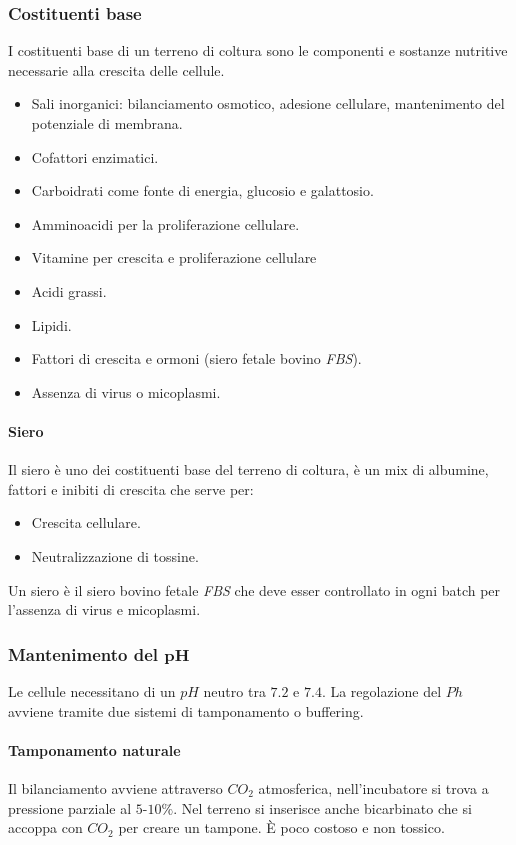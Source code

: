 		\subsubsection{Costituenti base}
		I costituenti base di un terreno di coltura sono le componenti e sostanze nutritive necessarie alla crescita delle cellule.
		\begin{multicols}{2}
			\begin{itemize}
				\item Sali inorganici: bilanciamento osmotico, adesione cellulare, mantenimento del potenziale di membrana.
				\item Cofattori enzimatici.
				\item Carboidrati come fonte di energia, glucosio e galattosio.
				\item Amminoacidi per la proliferazione cellulare.
				\item Vitamine per crescita e proliferazione cellulare
				\item Acidi grassi.
				\item Lipidi.
				\item Fattori di crescita e ormoni (siero fetale bovino \emph{FBS}).
				\item Assenza di virus o micoplasmi.
			\end{itemize}
		\end{multicols}
			\paragraph{Siero}
			Il siero \`e uno dei costituenti base del terreno di coltura, \`e un mix di albumine, fattori e inibiti di crescita che serve per:
			\begin{itemize}
				\item Crescita cellulare.
				\item Neutralizzazione di tossine.
			\end{itemize}
			Un siero \`e il siero bovino fetale \emph{FBS} che deve esser controllato in ogni batch per l'assenza di virus e micoplasmi. 
		
		\subsubsection{Mantenimento del $\mathbf{pH}$}
		Le cellule necessitano di un $pH$ neutro tra $7.2$ e $7.4$.
		La regolazione del $Ph$ avviene tramite due sistemi di tamponamento o buffering.

			\paragraph{Tamponamento naturale}
			Il bilanciamento avviene attraverso \emph{$CO_2$} atmosferica, nell'incubatore si trova a pressione parziale al $5$-$10\%$.
			Nel terreno si inserisce anche bicarbinato che si accoppa con \emph{$CO_2$} per creare un tampone.
			\`E poco costoso e non tossico.

